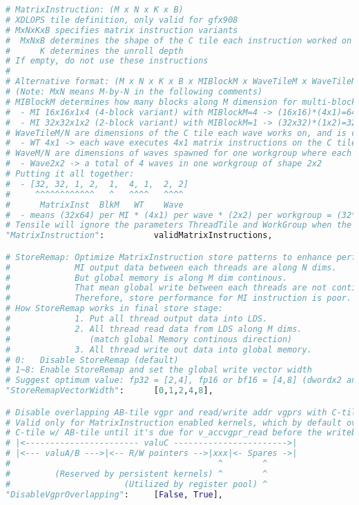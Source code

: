 \documentclass[]{article}
\begin{document}
\begin{lstlisting}[language=python,breaklines=true]
# MatrixInstruction: (M x N x K x B)
# XDLOPS tile definition, only valid for gfx908
# MxNxKxB specifies matrix instruction variants
#  MxNxB determines the shape of the C tile each instruction worked on
#      K determines the unroll depth
# If empty, do not use these instructions
#
# Alternative format: (M x N x K x B x MIBlockM x WaveTileM x WaveTileN x WaveM x WaveN)
# (Note: MxN means M-by-N in the following comments)
# MIBlockM determines how many blocks along M dimension for multi-block MI variants. Concrete examples:
#  - MI 16x16x1x4 (4-block variant) with MIBlockM=4 -> (16x16)*(4x1)=64x16 tile per instruction executed
#  - MI 32x32x1x2 (2-block variant) with MIBlockM=1 -> (32x32)*(1x2)=32x64 tile per instruction executed
# WaveTileM/N are dimensions of the C tile each wave works on, and is close to the concept of ThreadTile in classic VALU kernels
#  - WT 4x1 -> each wave executes 4x1 matrix instructions on the C tile of total area (4*MITileM)x(1*MITileN)
# WaveM/N are dimensions of waves spawned for one workgroup where each wave consists of 64 threads
#  - Wave2x2 -> a total of 4 waves in one workgroup of shape 2x2
# Putting it all together:
#  - [32, 32, 1, 2,  1,  4, 1,  2, 2]
#     ^^^^^^^^^^^^   ^   ^^^^   ^^^^
#      MatrixInst  BlkM   WT    Wave
#  - means (32x64) per MI * (4x1) per wave * (2x2) per workgroup = (32*4*2)x(64*1*2) = 256x128 macro tile
# Tensile will ignore the parameters ThreadTile and WorkGroup when the alternative format is used
"MatrixInstruction":          validMatrixInstructions,

# StoreRemap: Optimize MatrixInstruction store patterns to enhance performance.
#             MI output data between each threads are along N dims.
#             But global memory is along M dim continous.
#             That mean global write between each threads are not continous.
#             Therefore, store performance for MI instruction is poor.
# How StoreRemap works in final store stage:
#             1. Put all thread output data into LDS.
#             2. All thread read data from LDS along M dims.
#                (match global Memory continous direction)
#             3. All thread write out data into global memory.
# 0:   Disable StoreRemap (default)
# 1~8: Enable StoreRemap and set the global write vector width
# Suggest optimum value: fp32 = [2,4], fp16 or bf16 = [4,8] (dwordx2 and dowrdx4)
"StoreRemapVectorWidth":      [0,1,2,4,8],

# Disable overlapping AB-tile vgpr and read/write addr vgprs with C-tile vgprs
# Valid only for MatrixInstruction enabled kernels, which by default overlaps
# C-tile w/ AB-tile until it's due for v_accvgpr_read before the writeback. Illustrated below:
# |<----------------------- valuC ----------------------->|
# |<--- valuA/B --->|<-- R/W pointers -->|xxx|<- Spares ->|
#                                          ^        ^
#         (Reserved by persistent kernels) ^        ^
#                       (Utilized by register pool) ^
"DisableVgprOverlapping":     [False, True],


\end{lstlisting}
\end{document}
